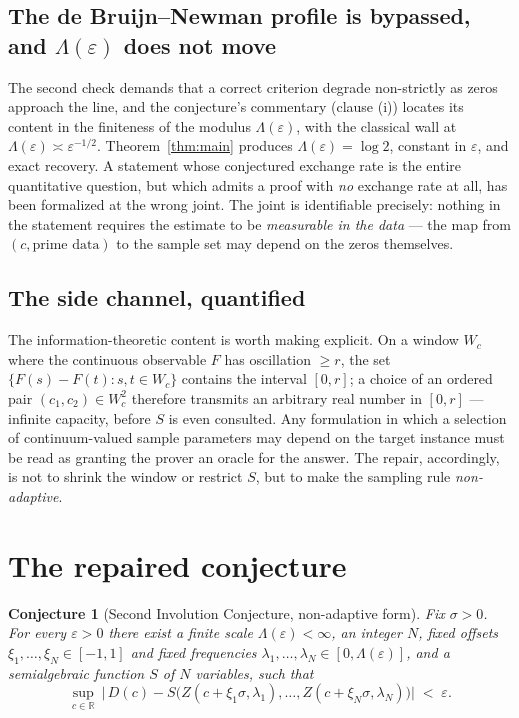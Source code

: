 \documentclass[11pt]{amsart}
\newtheorem{conjecture}[theorem]{Conjecture}
\theoremstyle{definition}
\theoremstyle{remark}
\newcommand{\RR}{\mathbb{R}}
\begin{document}
\subsection{The de Bruijn--Newman profile is bypassed, and $\Lambda(\varepsilon)$ does not move}
The second check demands that a correct criterion degrade non-strictly as zeros approach the line, and the conjecture's commentary (clause (i)) locates its content in the finiteness of the modulus $\Lambda(\varepsilon)$, with the classical wall at $\Lambda(\varepsilon)\asymp\varepsilon^{-1/2}$. Theorem~\ref{thm:main} produces $\Lambda(\varepsilon)=\log2$, constant in $\varepsilon$, and exact recovery. A statement whose conjectured exchange rate is the entire quantitative question, but which admits a proof with \emph{no} exchange rate at all, has been formalized at the wrong joint. The joint is identifiable precisely: nothing in the statement requires the estimate to be \emph{measurable in the data} --- the map from $(c,\text{prime data})$ to the sample set may depend on the zeros themselves.
\subsection{The side channel, quantified}
The information-theoretic content is worth making explicit. On a window $W_c$ where the continuous observable $F$ has oscillation $\ge r$, the set $\{F(s)-F(t):s,t\in W_c\}$ contains the interval $[0,r]$; a choice of an ordered pair $(c_1,c_2)\in W_c^2$ therefore transmits an arbitrary real number in $[0,r]$ --- infinite capacity, before $S$ is even consulted. Any formulation in which a selection of continuum-valued sample parameters may depend on the target instance must be read as granting the prover an oracle for the answer. The repair, accordingly, is not to shrink the window or restrict $S$, but to make the sampling rule \emph{non-adaptive}.

\section{The repaired conjecture}\label{sec:repair}

\begin{conjecture}[Second Involution Conjecture, non-adaptive form]\label{conj:repaired}
Fix $\sigma>0$. For every $\varepsilon>0$ there exist a finite scale $\Lambda(\varepsilon)<\infty$, an integer $N$, \emph{fixed} offsets $\xi_1,\dots,\xi_N\in[-1,1]$ and \emph{fixed} frequencies $\lambda_1,\dots,\lambda_N\in[0,\Lambda(\varepsilon)]$, and a semialgebraic function $S$ of $N$ variables, such that
\[
\sup_{c\in\RR}\ \big|\,D(c)-S\big(Z(c+\xi_1\sigma,\lambda_1),\dots,Z(c+\xi_N\sigma,\lambda_N)\big)\big|\;<\;\varepsilon .
\]
\end{conjecture}
\end{document}
